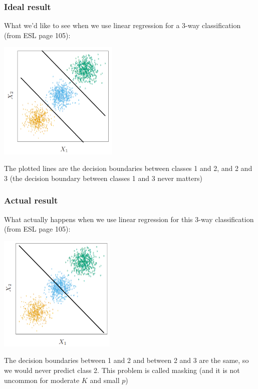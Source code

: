 \documentclass[mathserif]{beamer}
\def\red{\color[rgb]{0.8,0,0}}
\begin{document}
\begin{frame}
\frametitle{Ideal result}
\smallskip
What we'd like to see when we use linear regression for a
3-way classification (from ESL page 105):
\vspace{-2pt}
\begin{center}
\includegraphics[width=2.25in]{ideal.png}
\end{center}
\vspace{-5pt}
The plotted lines are the decision boundaries between classes 1 and 2, and 2 and 3
(the decision boundary between classes 1 and 3 never matters)
\end{frame}

\begin{frame}
\frametitle{Actual result}
\smallskip
What actually happens when we use linear regression for this 3-way classification
(from ESL page 105):
\begin{center}
\includegraphics[width=2.20in]{actual.png}
\end{center}
\vspace{-5pt}
The decision boundaries between 1 and 2 and between 2 and 3 are the same, so we 
would never predict class 2. This problem is called {\red masking} (and it is not
uncommon for moderate $K$ and small $p$)
\end{frame}
\end{document}
